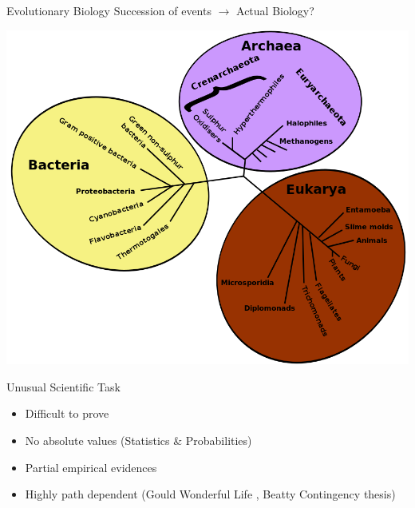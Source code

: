 \documentclass[12pt, notes=show]{beamer}
\begin{document}
\begin{frame}{Evolutionary Biology}
Succession of events $\rightarrow$ Actual Biology?
	\begin{center}
	    \includegraphics[width=.8\textheight]{images/treeOfLife.png}
	\end{center}
\end{frame}
\begin{frame}{Unusual Scientific Task}
    \vfill
    \begin{itemize}
	\item Difficult to prove
	    \vfill
	\item No absolute values (Statistics \& Probabilities)
	    \vfill
	\item Partial empirical evidences
	    \vfill
	\item  Highly path dependent (Gould Wonderful Life , Beatty Contingency thesis)
    \end{itemize}
    \vfill
\end{frame}
\end{document}
